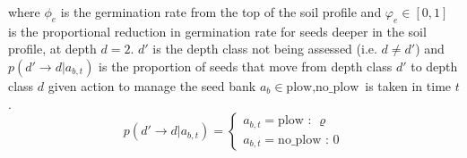 \documentclass[12pt, a4paper]{article}
\begin{document}
where $\phi_e$ is the germination rate from the top of the soil profile and $\varphi_e \in [0, 1]$ is the proportional reduction in germination rate for seeds deeper in the soil profile, at depth $d = 2$. $d'$ is the depth class not being assessed (i.e. $d \neq d'$) and $p(d' \rightarrow d|a_{b,t})$ is the proportion of seeds that move from depth class $d'$ to depth class $d$ given action to manage the seed bank $a_b \in {\text{plow}, \text{no\_plow}}$ is taken in time $t$. 
\begin{equation}
	p(d' \rightarrow d|a_{b,t}) = \begin{cases}
		a_{b,t} = \text{plow : } \varrho \\
		a_{b,t} = \text{no\_plow : } 0
	\end{cases}
\end{equation}   
\end{document}
